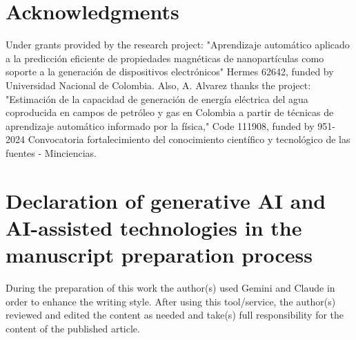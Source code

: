 \documentclass[final,5p,times,twocolumn]{elsarticle}
\begin{document}
\section*{Acknowledgments}
Under grants provided by the research project: "Aprendizaje automático aplicado a la predicción eficiente de propiedades magnéticas de nanopartículas como soporte a la generación de dispositivos electrónicos" Hermes 62642, funded by Universidad Nacional de Colombia. Also, A. Alvarez thanks the project: "Estimación de la capacidad de generación de energía eléctrica del agua coproducida en campos de petróleo y gas en Colombia a partir de técnicas de aprendizaje automático informado por la física," Code 111908, funded by 951-2024 Convocatoria fortalecimiento del conocimiento científico y tecnológico de las fuentes - Minciencias.

\section*{Declaration of generative AI and AI-assisted technologies in the manuscript preparation process}

During the preparation of this work the author(s) used Gemini and Claude in order to enhance the writing style. After using this tool/service, the author(s) reviewed and edited the content as needed and take(s) full responsibility for the content of the published article.



%
%

\end{document}

